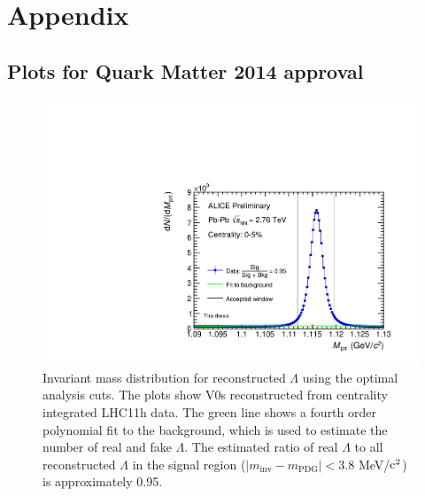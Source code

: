 \section{Appendix}
\subsection{Plots for Quark Matter 2014 approval}
\begin{figure}[hbtp]
\includegraphics[width=36pc]{Figures/2014-05-11-LamMinv-CommentCorrections.pdf}
\caption[$\Lambda$ invariant mass distribution]{Invariant mass distribution for reconstructed $\Lambda$ using the optimal analysis cuts.  
The plots show V0s reconstructed from centrality integrated LHC11h data.  
The green line shows a fourth order polynomial fit to the background, which is used to estimate the number of real and fake $\Lambda$.  
The estimated ratio of real $\Lambda$ to all reconstructed $\Lambda$ in the signal region ($ \lvert m_{\mathrm{inv}} - m_{\mathrm{PDG}}\rvert < 3.8$ MeV/$\rm c^2$) is approximately 0.95.}
\label{fig:AppendixLamInvMass}
\end{figure}

